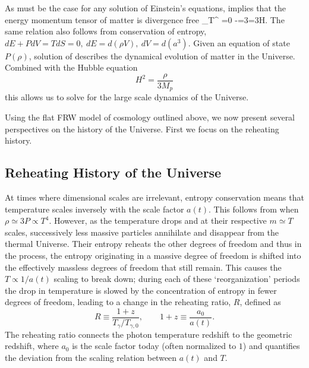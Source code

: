 As must be the case for any solution of Einstein's equations,    implies that the energy momentum tensor of matter is divergence free
\beqn\label{divTmn}
\nabla_\nu T^{\mu\nu} =0 \Rightarrow -=3=3H.
\eeqn
 The same relation also follows from  conservation of entropy, $dE+PdV=TdS=0,\  dE=d(\rho V),\  dV=d(a^3)$. Given an equation of state $P(\rho)$, solution of  describes the dynamical evolution of matter in the Universe. Combined with the Hubble equation
\begin{equation}\label{Hubble_eq}
H^2=\frac{\rho}{3M_p}
\end{equation}
this allows us to solve for the large scale dynamics of the Universe. 

Using the flat FRW model of cosmology outlined above, we now present several perspectives on the history of the Universe.  First we focus on the reheating history. 

\subsection{Reheating History of the Universe}\label{Eralink}

At times where dimensional scales are irrelevant, entropy conservation means that  temperature scales inversely with the scale factor $a(t)$. This follows from  when $ \rho\simeq 3P   \propto T^4$. However, as the temperature drops and at their respective $m\simeq T$ scales, successively less massive particles annihilate and disappear from the thermal Universe. Their entropy reheats the other degrees of freedom and thus in the process, the entropy originating in a massive degree of freedom is shifted into the effectively massless degrees of freedom that still remain.  This causes the  $T\propto 1/a(t)$ scaling to break down; during each of these `reorganization' periods the drop in temperature is slowed by the concentration of entropy in fewer degrees of freedom, leading to a change in the reheating ratio, $R$, defined as
\begin{equation}\label{redshiftratio}
R\equiv \frac{1+z}{ T_\gamma/T_{\gamma,0}}, \qquad 1+z\equiv \frac{a_{0}}{a(t)}.
\end{equation}
The reheating ratio connects the photon temperature redshift to the geometric redshift, where $a_0$ is the scale factor today (often normalized to $1$) and quantifies the deviation from the scaling relation between $a(t)$ and $T$.

